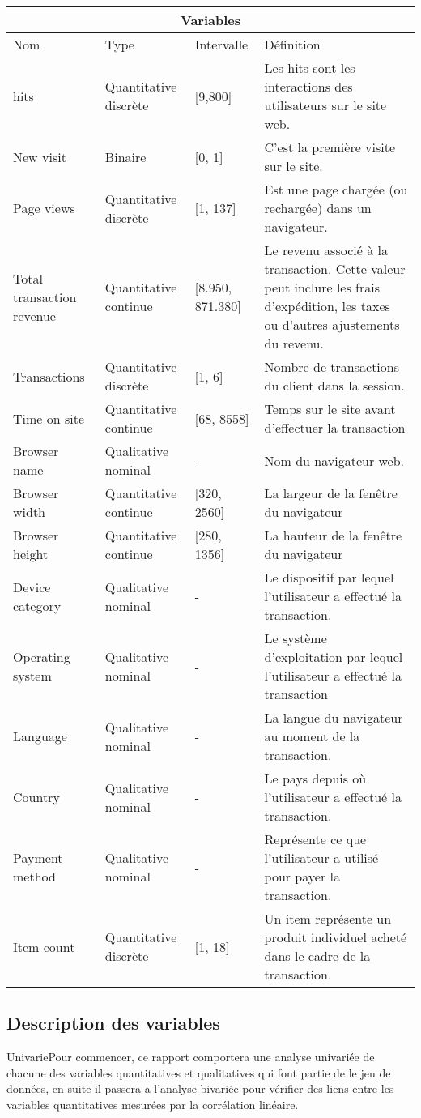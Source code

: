 \begin{center}
\begin{longtable}{ |p{3cm}||p{3cm}|p{2cm}|p{5cm}|  }
 \hline
 \multicolumn{4}{|c|}{Variables} \\
 \hline
 Nom & Type &Intervalle&Définition\\
 \hline
 hits   & Quantitative discrète  &[9,800]&  Les hits sont les interactions des utilisateurs sur le site web.\\
New visit &   Binaire   & [0, 1]   & C'est la première visite sur le site.\\
Page views&   Quantitative discrète  & [1, 137]   &Est une page chargée (ou rechargée) dans un navigateur.\\
Total transaction revenue & Quantitative continue  &[8.950, 871.380]&  Le revenu associé à la transaction. Cette valeur peut inclure les frais d'expédition, les taxes ou d'autres ajustements du revenu.\\
Transactions    &Quantitative discrète  & [1, 6] &  Nombre de transactions du client dans la session.\\
Time on site&   Quantitative continue  & [68, 8558]& Temps sur le site avant d'effectuer la transaction \\
 Browser name& Qualitative nominal  & -   & Nom du navigateur web.\\
 Browser width& Quantitative continue  & [320, 2560]& La largeur de la fenêtre du navigateur \\
 Browser height& Quantitative continue  & [280, 1356]& La hauteur de la fenêtre du navigateur\\
 Device category& Qualitative nominal   & -&Le dispositif par lequel l'utilisateur a effectué la transaction.\\
 Operating system& Qualitative nominal  & -&Le système d'exploitation par lequel l'utilisateur a effectué la transaction\\
 Language& Qualitative nominal  & -& La langue du navigateur au moment de la transaction.\\
 Country& Qualitative nominal   & -& Le pays depuis où l'utilisateur a effectué la transaction.\\
 Payment method& Qualitative nominal   & -&  Représente  ce que l'utilisateur a utilisé pour payer la transaction.\\
 Item count& Quantitative discrète  & [1, 18]& Un item représente un produit individuel acheté dans le cadre de la transaction. \\
 \hline
\end{longtable}
\end{center}

\subsection{Description des variables}
UnivariePour commencer, ce rapport comportera une analyse univariée de chacune des variables quantitatives et qualitatives qui font partie de le jeu de données, en suite il passera a l'analyse bivariée pour vérifier des liens entre les variables quantitatives mesurées par la corrélation linéaire.




